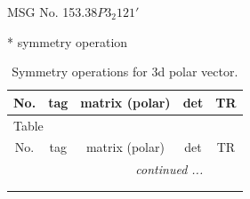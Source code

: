 \documentclass[fleqn,8pt]{jsarticle}
\begin{document}
\setcounter{MaxMatrixCols}{32}

\renewcommand{\tablename}{Table~}
\renewcommand{\figurename}{Figure~}
\begin{center}
\LARGE
MSG No. 153.38\quad$P3_{2}121'$
\end{center}
* symmetry operation
\renewcommand{\arraystretch}{1.3}
\begin{longtable}{ccccc}
\caption{Symmetry operations for 3d polar vector.}
 \\
 \hline \hline
No. & tag & matrix (polar) & det & TR \\ \hline \endfirsthead

\multicolumn{4}{l}{\tablename\ \thetable{}} \\
 \hline \hline
No. & tag & matrix (polar) & det & TR \\ \hline \endhead

 \hline \hline
\multicolumn{4}{r}{\footnotesize\it continued ...} \\ \endfoot

 \hline \hline
\multicolumn{4}{r}{} \\ \endlastfoot


\end{longtable}
\end{document}
